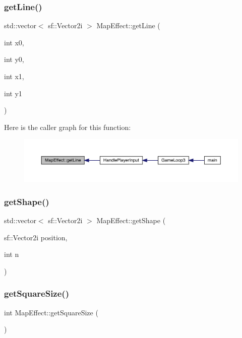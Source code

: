 \subsubsection{\texorpdfstring{get\+Line()}{getLine()}}
{\footnotesize\ttfamily std\+::vector$<$ sf\+::\+Vector2i $>$ Map\+Effect\+::get\+Line (\begin{DoxyParamCaption}\item[{int}]{x0,  }\item[{int}]{y0,  }\item[{int}]{x1,  }\item[{int}]{y1 }\end{DoxyParamCaption})}

Here is the caller graph for this function\+:\nopagebreak
\begin{figure}[H]
\begin{center}
\leavevmode
\includegraphics[width=350pt]{de/de4/class_map_effect_a7aeebd5eef57c00feabca583a38c5361_icgraph}
\end{center}
\end{figure}
\mbox{\label{class_map_effect_a4557d94941b97471dce7ac47e30825c5}} 
\subsubsection{\texorpdfstring{get\+Shape()}{getShape()}}
{\footnotesize\ttfamily std\+::vector$<$ sf\+::\+Vector2i $>$ Map\+Effect\+::get\+Shape (\begin{DoxyParamCaption}\item[{sf\+::\+Vector2i}]{position,  }\item[{int}]{n }\end{DoxyParamCaption})}

\mbox{\label{class_map_effect_aa96fb614319095fdc9003d85ea4647e2}} 
\subsubsection{\texorpdfstring{get\+Square\+Size()}{getSquareSize()}}
{\footnotesize\ttfamily int Map\+Effect\+::get\+Square\+Size (\begin{DoxyParamCaption}{ }\end{DoxyParamCaption})}


